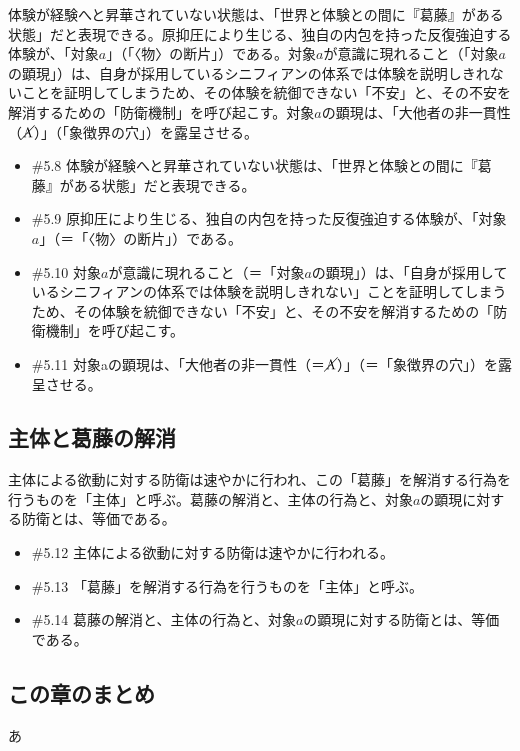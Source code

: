 体験が経験へと昇華されていない状態は、「世界と体験との間に『葛藤』がある状態」だと表現できる。原抑圧により生じる、独自の内包を持った反復強迫する体験が、「対象\(a\)」（「〈物〉の断片」）である。対象\(a\)が意識に現れること（「対象\(a\)の顕現」）は、自身が採用しているシニフィアンの体系では体験を説明しきれないことを証明してしまうため、その体験を統御できない「不安」と、その不安を解消するための「防衛機制」を呼び起こす。対象\(a\)の顕現は、「大他者の非一貫性（\(\cancel{\textrm{A}}\)）」（「象徴界の穴」）を露呈させる。

\begin{note}{}
  \begin{itemize}
    \tightlist
    \item{\#5.8}
      体験が経験へと昇華されていない状態は、「世界と体験との間に『葛藤』がある状態」だと表現できる。
    \item{\#5.9}
      原抑圧により生じる、独自の内包を持った反復強迫する体験が、「対象$a$」（＝「〈物〉の断片」）である。
    \item{\#5.10}
      対象$a$が意識に現れること（＝「対象$a$の顕現」）は、「自身が採用しているシニフィアンの体系では体験を説明しきれない」ことを証明してしまうため、その体験を統御できない「不安」と、その不安を解消するための「防衛機制」を呼び起こす。
    \item{\#5.11}
      対象aの顕現は、「大他者の非一貫性（＝$\cancel{\textrm{A}}$）」（＝「象徴界の穴」）を露呈させる。
  \end{itemize}
\end{note}

\subsection{主体と葛藤の解消}\label{ux4e3bux4f53ux3068ux845bux85e4ux306eux89e3ux6d88}

主体による欲動に対する防衛は速やかに行われ、この「葛藤」を解消する行為を行うものを「主体」と呼ぶ。葛藤の解消と、主体の行為と、対象\(a\)の顕現に対する防衛とは、等価である。

\begin{note}{}
  \begin{itemize}
    \tightlist
    \item{\#5.12}
      主体による欲動に対する防衛は速やかに行われる。
    \item{\#5.13}
      「葛藤」を解消する行為を行うものを「主体」と呼ぶ。
    \item{\#5.14}
      葛藤の解消と、主体の行為と、対象$a$の顕現に対する防衛とは、等価である。
  \end{itemize}
\end{note}

\subsection{この章のまとめ}\label{ux3053ux306eux7ae0ux306eux307eux3068ux3081}

あ
